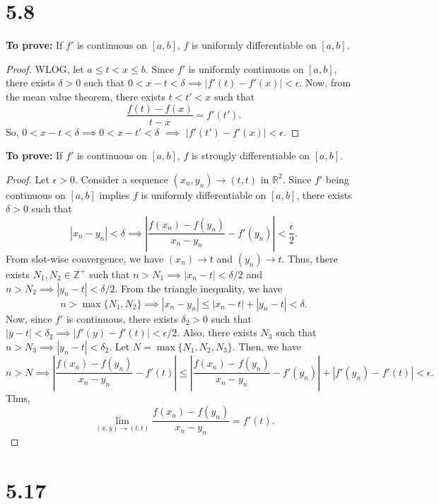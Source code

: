 \documentclass[12pt]{article}
\begin{document}
\pagebreak

\section{5.8}

{\bf To prove:} If $f'$ is continuous on $[a, b]$, $f$ is uniformly differentiable on $[a, b]$.


\begin{proof} 


WLOG, let $a\leq t < x \leq b$. Since $f'$ is uniformly continuous on $[a, b]$, there exists $\delta>0$ such that $0<x-t<\delta \implies |f'(t)-f'(x)|<\epsilon$. Now, from the mean value theorem, there exists $t<t'<x$ such that
$$
\frac{{f(t)-f(x)}}{t-x}=f'(t').
$$
So, $0<x-t<\delta \implies 0<x-t'<\delta$ $\implies$ $|f'(t')-f'(x)|<\epsilon$.
\end{proof}

{\bf To prove:} If $f'$ is continuous on $[a, b]$, $f$ is strongly differentiable on $[a, b]$.
\begin{proof} 
Let $\epsilon>0$. Consider a sequence $(x_{n}, y_{n})\to(t, t)$ in $\mathbb{R}^{2}$. Since $f'$ being continuous on $[a, b]$ implies $f$ is uniformly differentiable on $[a, b]$, there exists $\delta>0$ such that
$$
|x_{n}-y_{n}|<\delta \implies \left|\frac{{f(x_{n})-f(y_{n})}}{x_{n}-y_{n}}-f'(y_{n})\right|< \frac{\epsilon}{2}.
$$
From slot-wise convergence, we have $(x_{n})\to t$ and $(y_{n})\to t$. Thus, there exists $N_{1}, N_{2}\in \mathbb{Z}^{+}$ such that $n>N_{1}\implies |x_{n} - t|< \delta/2$ and $n>N_{2} \implies |y_{n}-t|< \delta/2$. From the triangle inequality, we have
$$
n>\max\{N_{1}, N_{2}\} \implies|x_{n}-y_{n}|\leq |x_{n}-t|+|y_{n}-t|<\delta.
$$
Now, since $f'$ is continuous, there exists $\delta_{2}>0$ such that $|y-t|<\delta_{2}\implies |f'(y)-f'(t)|< \epsilon/2$. Also, there exists $N_{3}$ such that $n>N_{3} \implies |y_{n}-t|<\delta_{2}$. Let $N=\max\{ N_{1}, N_{2} , N_{3}\}$. Then, we have
$$
n>N \implies \left|\frac{{f(x_{n})-f(y_{n})}}{x_{n}-y_{n}}-f'(t)\right| \leq \left|\frac{{f(x_{n})-f(y_{n})}}{x_{n}-y_{n}}-f'(y_{n})\right|+|f'(y_{n})-f'(t)|<\epsilon.
$$
Thus, 
$$
\lim_{ (x, y) \to (t, t) } \frac{{f(x_{n})-f(y_{n})}}{x_{n}-y_{n}}=f'(t).
$$
\end{proof}
\pagebreak




\section{5.17}
\end{document}
